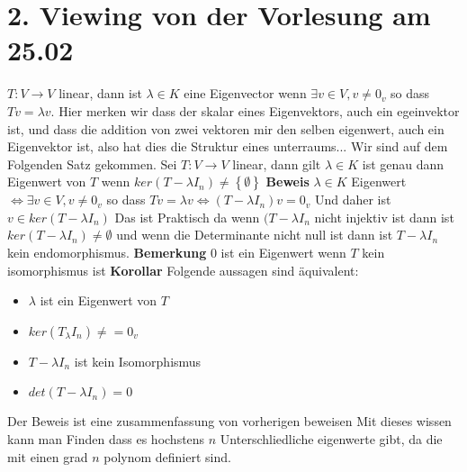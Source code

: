 \documentclass{article}
\begin{document}
\section{2. Viewing von der Vorlesung am 25.02}
$T:V\rightarrow V$ linear, dann ist $\lambda \in K$ eine Eigenvector wenn $\exists v\in V,v\neq 0_v$ so dass $Tv=\lambda v$. Hier merken wir dass der skalar eines Eigenvektors, auch ein egeinvektor ist, und dass die addition von zwei vektoren mir den selben eigenwert, auch ein Eigenvektor ist, also hat dies die Struktur eines unterraums...\newline
Wir sind auf dem Folgenden Satz gekommen. Sei $T:V\rightarrow V$ linear, dann gilt $\lambda \in K$ ist genau dann Eigenwert von $T$ wenn $ker(T-\lambda I_n)\neq\left\lbrace\emptyset\right\rbrace$\newline
\textbf{Beweis} $\lambda \in K$ Eigenwert $\Leftrightarrow \exists v\in V, v\neq 0_v$ so dass $Tv=\lambda v\Leftrightarrow (T-\lambda I_n)v=0_v$ Und daher ist $v\in ker(T-\lambda I_n)$ 
\newline Das ist Praktisch da wenn $(T-\lambda I_n$ nicht injektiv ist dann ist $ker(T-\lambda I_n)\neq \emptyset$ und wenn die Determinante nicht null ist dann ist $T-\lambda I_n$ kein endomorphismus.\newline
\textbf{Bemerkung} 0 ist ein Eigenwert wenn $T$ kein isomorphismus ist\newline
\textbf{Korollar} Folgende aussagen sind äquivalent: \begin{itemize}
\item{$\lambda$ ist ein Eigenwert von $T$}
\item{$ker(T_\lambda I_n)\neq =0_v$}
\item{$T-\lambda I_n$ ist kein Isomorphismus}
\item{$det(T-\lambda I_n)=0$}
\end{itemize}
Der Beweis ist eine zusammenfassung von vorherigen beweisen
\newline Mit dieses wissen kann man Finden dass es hochstens $n$ Unterschliedliche eigenwerte gibt, da die mit einen grad $n$ polynom definiert sind.
\end{document}
